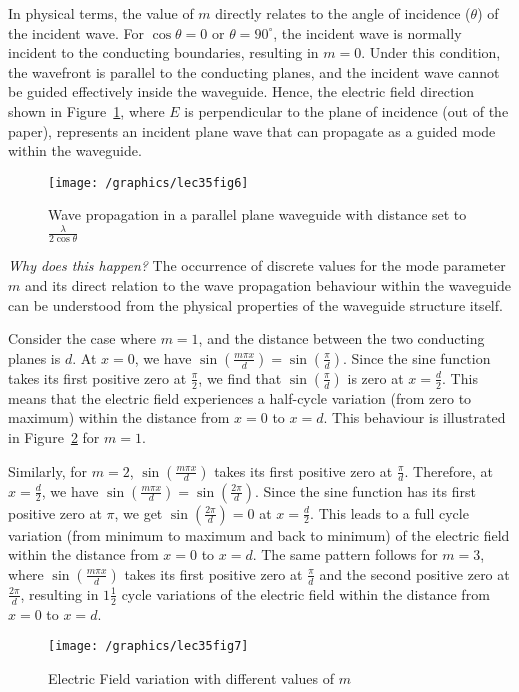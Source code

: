 In physical terms, the value of $m$ directly relates to the angle of incidence ($\theta$) of the incident wave. For $\cos\theta=0$ or $\theta=90^\circ$, the incident wave is normally incident to the conducting boundaries, resulting in $m=0$. Under this condition, the wavefront is parallel to the conducting planes, and the incident wave cannot be guided effectively inside the waveguide. Hence, the electric field direction shown in Figure~\ref{fig:lec35fig6}, where $E$ is perpendicular to the plane of incidence (out of the paper), represents an incident plane wave that can propagate as a guided mode within the waveguide.
\begin{figure}[h]
\centering
\texttt{[image: /graphics/lec35fig6]}
\caption{Wave propagation in a parallel plane waveguide with distance set to $\frac{\lambda}{2\cos\theta}$}
\label{fig:lec35fig6}
\end{figure}

\emph{Why does this happen?} The occurrence of discrete values for the mode parameter $m$ and its direct relation to the wave propagation behaviour within the waveguide can be understood from the physical properties of the waveguide structure itself.

Consider the case where $m=1$, and the distance between the two conducting planes is $d$. At $x=0$, we have $\sin(\frac{m\pi x}{d}) = \sin(\frac{\pi}{d})$. Since the sine function takes its first positive zero at $\frac{\pi}{2}$, we find that $\sin(\frac{\pi}{d})$ is zero at $x=\frac{d}{2}$. This means that the electric field experiences a half-cycle variation (from zero to maximum) within the distance from $x=0$ to $x=d$. This behaviour is illustrated in Figure~\ref{fig:lec35fig7} for $m=1$.

Similarly, for $m=2$, $\sin(\frac{m\pi x}{d})$ takes its first positive zero at $\frac{\pi}{d}$. Therefore, at $x=\frac{d}{2}$, we have $\sin(\frac{m\pi x}{d}) = \sin(\frac{2\pi}{d})$. Since the sine function has its first positive zero at $\pi$, we get $\sin(\frac{2\pi}{d})=0$ at $x=\frac{d}{2}$. This leads to a full cycle variation (from minimum to maximum and back to minimum) of the electric field within the distance from $x=0$ to $x=d$. The same pattern follows for $m=3$, where $\sin(\frac{m\pi x}{d})$ takes its first positive zero at $\frac{\pi}{d}$ and the second positive zero at $\frac{2\pi}{d}$, resulting in $1\frac{1}{2}$ cycle variations of the electric field within the distance from $x=0$ to $x=d$.
\begin{figure}[h]
\centering
\texttt{[image: /graphics/lec35fig7]}
\caption{Electric Field variation with different values of $m$}
\label{fig:lec35fig7}
\end{figure}

